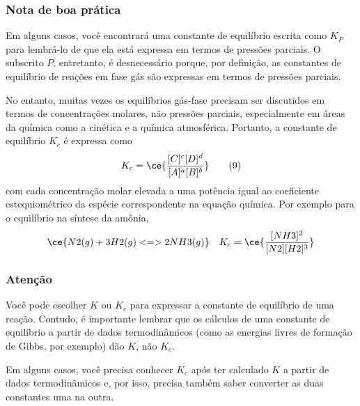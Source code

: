 \begin{info}

\subsubsection{Nota de boa prática}

Em alguns casos, você encontrará uma constante de equilíbrio escrita como \(K_P\) para lembrá-lo de que ela está expressa em termos de pressões
parciais. O subscrito \(P\), entretanto, é desnecessário porque, por definição, as constantes de equilíbrio de reações em fase gás são expressas em
termos de pressões parciais.

\end{info}

No entanto, muitas vezes os equilíbrios gás-fase precisam ser discutidos em termos de concentrações molares, não pressões parciais, especialmente em
áreas da química como a cinética e a química atmosférica. Portanto, a constante de equilíbrio \(K_c\) é expressa como \[
     K_c = \ce{\frac{ [C]^c [D]^d }{ [A]^a [B]^b } }
\tag{9}
\] com cada concentração molar elevada a uma potência igual ao coeficiente estequiométrico da espécie correspondente na equação química. Por exemplo
para o equilíbrio na síntese da amônia, \[
    \ce{ N2(g) + 3 H2(g) <=> 2 NH3(g) } \quad K_c = \ce{ \frac{ [NH3]^2 }{ [N2] [H2]^3 } }
\]

\begin{warning}

\subsubsection{Atenção}

Você pode escolher \(K\) ou \(K_c\) para expressar a constante de equilíbrio de uma reação. Contudo, é importante lembrar que os cálculos de uma
constante de equilíbrio a partir de dados termodinâmicos (como as energias livres de formação de Gibbs, por exemplo) dão \(K\), não \(K_c\).

\end{warning}

Em alguns casos, você precisa conhecer \(K_c\) após ter calculado \(K\) a partir de dados termodinâmicos e, por isso, precisa também saber converter
as duas constantes uma na outra.

